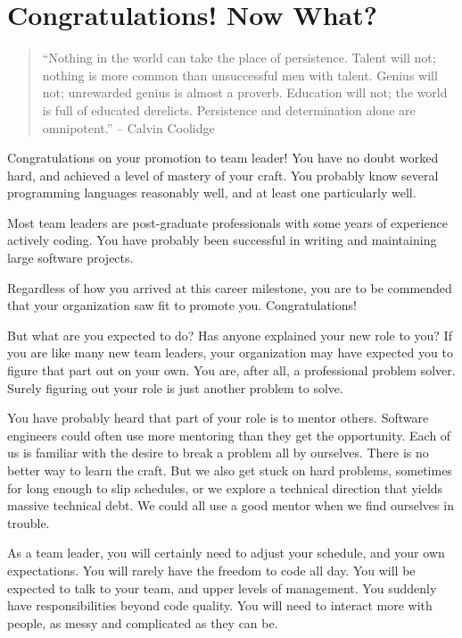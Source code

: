 %
%

\chapter{Congratulations! Now What?}

\begin{quote}
``Nothing in the world can take the place of persistence.  Talent will not; nothing is more common than unsuccessful men with talent. Genius will not; unrewarded genius is almost a proverb. Education will not; the world is full of educated derelicts. Persistence and determination alone are omnipotent.'' -- Calvin Coolidge
\end{quote}

Congratulations on your promotion to team leader! You have no doubt worked hard, and achieved a level of mastery of your craft. You probably know several programming languages reasonably well, and at least one particularly well.

Most team leaders are post-graduate professionals with some years of experience actively coding. You have probably been successful in writing and maintaining large software projects.

Regardless of how you arrived at this career milestone, you are to be commended that your organization saw fit to promote you. Congratulations!

But what are you expected to do? Has anyone explained your new role to you? If you are like many new team leaders, your organization may have expected you to figure that part out on your own. You are, after all, a professional problem solver. Surely figuring out your role is just another problem to solve.

You have probably heard that part of your role is to mentor others. Software engineers could often use more mentoring than they get the opportunity. Each of us is familiar with the desire to break a problem all by ourselves. There is no better way to learn the craft. But we also get stuck on hard problems, sometimes for long enough to slip schedules, or we explore a technical direction that yields massive technical debt. We could all use a good mentor when we find ourselves in trouble.

As a team leader, you will certainly need to adjust your schedule, and your own expectations. You will rarely have the freedom to code all day. You will be expected to talk to your team, and upper levels of management. You suddenly have responsibilities beyond code quality. You will need to interact more with people, as messy and complicated as they can be.

